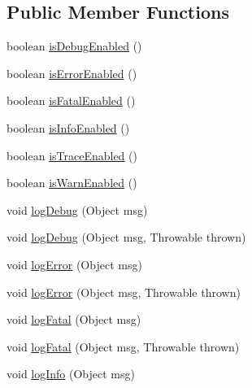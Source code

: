 \subsection*{Public Member Functions}
\begin{DoxyCompactItemize}
\item 
boolean \mbox{\hyperlink{interfacecom_1_1mysql_1_1cj_1_1log_1_1_log_a8340f13152932af117ec2f5884c06dd3}{is\+Debug\+Enabled}} ()
\item 
boolean \mbox{\hyperlink{interfacecom_1_1mysql_1_1cj_1_1log_1_1_log_abda4b698026fdb26c74b211b521628c9}{is\+Error\+Enabled}} ()
\item 
boolean \mbox{\hyperlink{interfacecom_1_1mysql_1_1cj_1_1log_1_1_log_a61464d2603e609442da19c59c5c62f62}{is\+Fatal\+Enabled}} ()
\item 
boolean \mbox{\hyperlink{interfacecom_1_1mysql_1_1cj_1_1log_1_1_log_aecb7f781b61b516d6bad9ada8e7dd3aa}{is\+Info\+Enabled}} ()
\item 
boolean \mbox{\hyperlink{interfacecom_1_1mysql_1_1cj_1_1log_1_1_log_a814070e176d987da656b45662bc63ccd}{is\+Trace\+Enabled}} ()
\item 
boolean \mbox{\hyperlink{interfacecom_1_1mysql_1_1cj_1_1log_1_1_log_a7877db04f22a78b801a8f2f8989d7043}{is\+Warn\+Enabled}} ()
\item 
void \mbox{\hyperlink{interfacecom_1_1mysql_1_1cj_1_1log_1_1_log_a6149f715730ea0615ef6e341dd3e8a39}{log\+Debug}} (Object msg)
\item 
void \mbox{\hyperlink{interfacecom_1_1mysql_1_1cj_1_1log_1_1_log_a42c9900bc643b771d7e337686ac4f799}{log\+Debug}} (Object msg, Throwable thrown)
\item 
void \mbox{\hyperlink{interfacecom_1_1mysql_1_1cj_1_1log_1_1_log_ab6f35d1efab89f0c0316106fa4a15d2c}{log\+Error}} (Object msg)
\item 
void \mbox{\hyperlink{interfacecom_1_1mysql_1_1cj_1_1log_1_1_log_a96aab6e63a2ab9ebe3b640b7e253dd4f}{log\+Error}} (Object msg, Throwable thrown)
\item 
void \mbox{\hyperlink{interfacecom_1_1mysql_1_1cj_1_1log_1_1_log_a4f36fdcde6b1c88a4f1ba25a70555e3f}{log\+Fatal}} (Object msg)
\item 
void \mbox{\hyperlink{interfacecom_1_1mysql_1_1cj_1_1log_1_1_log_a54cd5e19bf210ab86b373400e2213229}{log\+Fatal}} (Object msg, Throwable thrown)
\item 
void \mbox{\hyperlink{interfacecom_1_1mysql_1_1cj_1_1log_1_1_log_a7f117433067520dd682da12ff9194f4b}{log\+Info}} (Object msg)
\item 

\end{DoxyCompactItemize}
